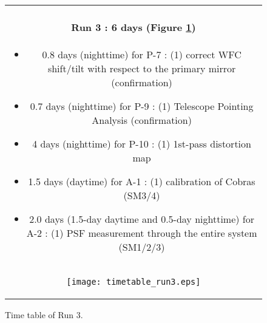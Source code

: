 \begin{figure}[!ht]
\begin{center}
\begin{tabular}{c}
\begin{minipage}{0.95\hsize}
\paragraph{Run 3 : 6 days  (Figure \ref{fig:run3})}
	\begin{itemize}
	\item 0.8 days (nighttime) for P-7 :
	(1) correct WFC shift/tilt with respect to the primary mirror (confirmation)
	\item 0.7 days (nighttime) for P-9 :
	(1) Telescope Pointing Analysis (confirmation)
	\item 4 days (nighttime) for P-10 : 
	(1) 1st-pass distortion map
	\item 1.5 days (daytime) for A-1 : 
	(1) calibration of Cobras (SM3/4)
	\item 2.0 days (1.5-day daytime and 0.5-day nighttime) for A-2 : 
	(1) PSF measurement through the entire system (SM1/2/3)
	\end{itemize}
\end{minipage} \\
\begin{minipage}{0.8\hsize}
	\begin{center}
	\vspace*{5mm}
	\texttt{[image: timetable\_run3.eps]}
	\end{center}
	\vspace*{-5mm}
	\caption{Time table of Run 3.}
	\label{fig:run3}
\end{minipage}
\end{tabular}
\end{center}
\end{figure}

